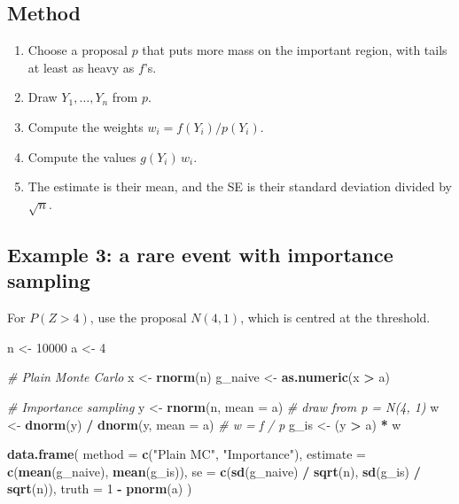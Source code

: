 \documentclass[
]{article}
\newenvironment{Shaded}{\begin{snugshade}}{\end{snugshade}}
\newcommand{\AttributeTok}[1]{\textcolor[rgb]{0.13,0.29,0.53}{#1}}
\newcommand{\CommentTok}[1]{\textcolor[rgb]{0.56,0.35,0.01}{\textit{#1}}}
\newcommand{\DecValTok}[1]{\textcolor[rgb]{0.00,0.00,0.81}{#1}}
\newcommand{\FunctionTok}[1]{\textcolor[rgb]{0.13,0.29,0.53}{\textbf{#1}}}
\newcommand{\NormalTok}[1]{#1}
\newcommand{\OtherTok}[1]{\textcolor[rgb]{0.56,0.35,0.01}{#1}}
\newcommand{\SpecialCharTok}[1]{\textcolor[rgb]{0.81,0.36,0.00}{\textbf{#1}}}
\newcommand{\StringTok}[1]{\textcolor[rgb]{0.31,0.60,0.02}{#1}}
\providecommand{\tightlist}{%
  \setlength{\itemsep}{0pt}\setlength{\parskip}{0pt}}
\begin{document}
\subsection{Method}\label{method-1}

\begin{enumerate}
\def\labelenumi{\arabic{enumi}.}
\tightlist
\item
  Choose a proposal \(p\) that puts more mass on the important region,
  with tails at least as heavy as \(f\)'s.
\item
  Draw \(Y_1,\dots,Y_n\) from \(p\).
\item
  Compute the weights \(w_i = f(Y_i)/p(Y_i)\).
\item
  Compute the values \(g(Y_i)\,w_i\).
\item
  The estimate is their mean, and the SE is their standard deviation
  divided by \(\sqrt n\).
\end{enumerate}

\subsection{Example 3: a rare event with importance
sampling}\label{example-3-a-rare-event-with-importance-sampling}

For \(P(Z>4)\), use the proposal \(N(4,1)\), which is centred at the
threshold.

\begin{Shaded}
\begin{Highlighting}[]
\NormalTok{n }\OtherTok{\textless{}{-}} \DecValTok{10000}
\NormalTok{a }\OtherTok{\textless{}{-}} \DecValTok{4}

\CommentTok{\# Plain Monte Carlo}
\NormalTok{x }\OtherTok{\textless{}{-}} \FunctionTok{rnorm}\NormalTok{(n)}
\NormalTok{g\_naive }\OtherTok{\textless{}{-}} \FunctionTok{as.numeric}\NormalTok{(x }\SpecialCharTok{\textgreater{}}\NormalTok{ a)}

\CommentTok{\# Importance sampling}
\NormalTok{y }\OtherTok{\textless{}{-}} \FunctionTok{rnorm}\NormalTok{(n, }\AttributeTok{mean =}\NormalTok{ a)                 }\CommentTok{\# draw from p = N(4, 1)}
\NormalTok{w }\OtherTok{\textless{}{-}} \FunctionTok{dnorm}\NormalTok{(y) }\SpecialCharTok{/} \FunctionTok{dnorm}\NormalTok{(y, }\AttributeTok{mean =}\NormalTok{ a)      }\CommentTok{\# w = f / p}
\NormalTok{g\_is }\OtherTok{\textless{}{-}}\NormalTok{ (y }\SpecialCharTok{\textgreater{}}\NormalTok{ a) }\SpecialCharTok{*}\NormalTok{ w}

\FunctionTok{data.frame}\NormalTok{(}
  \AttributeTok{method   =} \FunctionTok{c}\NormalTok{(}\StringTok{"Plain MC"}\NormalTok{, }\StringTok{"Importance"}\NormalTok{),}
  \AttributeTok{estimate =} \FunctionTok{c}\NormalTok{(}\FunctionTok{mean}\NormalTok{(g\_naive), }\FunctionTok{mean}\NormalTok{(g\_is)),}
  \AttributeTok{se       =} \FunctionTok{c}\NormalTok{(}\FunctionTok{sd}\NormalTok{(g\_naive) }\SpecialCharTok{/} \FunctionTok{sqrt}\NormalTok{(n), }\FunctionTok{sd}\NormalTok{(g\_is) }\SpecialCharTok{/} \FunctionTok{sqrt}\NormalTok{(n)),}
  \AttributeTok{truth    =} \DecValTok{1} \SpecialCharTok{{-}} \FunctionTok{pnorm}\NormalTok{(a)}
\NormalTok{)}
\end{Highlighting}
\end{Shaded}
\end{document}
